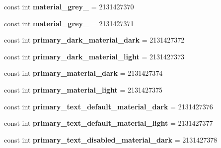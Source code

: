 \begin{DoxyCompactItemize}
const int {\bfseries material\+\_\+grey\+\_} = 2131427370
\item 
\mbox{\label{class_pinned_app_1_1_droid_1_1_resource_1_1_color_a9ccc624ada1f5cc01699406a5c7cf209}} 
const int {\bfseries material\+\_\+grey\+\_} = 2131427371
\item 
\mbox{\label{class_pinned_app_1_1_droid_1_1_resource_1_1_color_a3d3feae0b55c63b64129d3b7804fb495}} 
const int {\bfseries primary\+\_\+dark\+\_\+material\+\_\+dark} = 2131427372
\item 
\mbox{\label{class_pinned_app_1_1_droid_1_1_resource_1_1_color_abd1d35027df8d0d707571da0ea35c506}} 
const int {\bfseries primary\+\_\+dark\+\_\+material\+\_\+light} = 2131427373
\item 
\mbox{\label{class_pinned_app_1_1_droid_1_1_resource_1_1_color_a6c3ff55d964360a8dddcf15c3a686e14}} 
const int {\bfseries primary\+\_\+material\+\_\+dark} = 2131427374
\item 
\mbox{\label{class_pinned_app_1_1_droid_1_1_resource_1_1_color_af07be72ff60cedc05425df78bef360a1}} 
const int {\bfseries primary\+\_\+material\+\_\+light} = 2131427375
\item 
\mbox{\label{class_pinned_app_1_1_droid_1_1_resource_1_1_color_a1eee83b72f9e22afe0215766b3f8539f}} 
const int {\bfseries primary\+\_\+text\+\_\+default\+\_\+material\+\_\+dark} = 2131427376
\item 
\mbox{\label{class_pinned_app_1_1_droid_1_1_resource_1_1_color_a47c1eefc4efe3ac27abc338903d14e0a}} 
const int {\bfseries primary\+\_\+text\+\_\+default\+\_\+material\+\_\+light} = 2131427377
\item 
\mbox{\label{class_pinned_app_1_1_droid_1_1_resource_1_1_color_a2a967c14261f0bdad7585b8ef397cb59}} 
const int {\bfseries primary\+\_\+text\+\_\+disabled\+\_\+material\+\_\+dark} = 2131427378

\end{DoxyCompactItemize}
